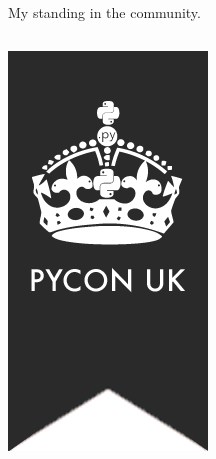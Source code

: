 \documentclass{beamer}
\begin{document}
\begin{frame}{My standing in the community.}
\begin{columns}
\begin{column}{0.2\textwidth}
\begin{center}
                \includegraphics[width=\textwidth]{static/pyconuk.png}
            \end{center}
        \end{column}
        \begin{column}{0.4\textwidth} 

\end{column}
\end{columns}
\end{frame}
\end{document}

